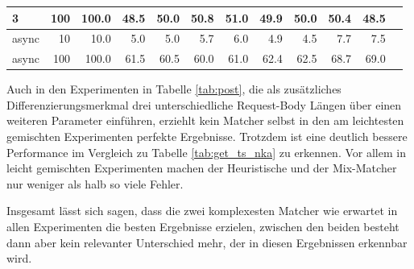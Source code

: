 \documentclass[12pt,a4paper]{report}
\begin{document}
\begin{table}[H]
\begin{tabular}{|l|r|r|r|r|r|r|r|r|r|r|r|}
		3                        & 100                                & 100.0                           & 48.5                        & 50.0                      & 50.8                           & 51.0 & 49.9 & 50.0 & 50.4 & 48.5 \\ \hline
		async                    & 10                                 & 10.0                            & 5.0                         & 5.0                       & 5.7                            & 6.0  & 4.9  & 4.5  & 7.7  & 7.5  \\ \hline
		async                    & 100                                & 100.0                           & 61.5                        & 60.5                      & 60.0                           & 61.0 & 62.4 & 62.5 & 68.7 & 69.0 \\ \hline
	\end{tabular}
\end{table}

Auch in den Experimenten in Tabelle \ref{tab:post}, die als zusätzliches Differenzierungsmerkmal drei unterschiedliche
Request-Body Längen über einen weiteren Parameter einführen, erziehlt kein Matcher selbst in den am leichtesten gemischten
Experimenten perfekte Ergebnisse. Trotzdem ist eine deutlich bessere Performance im Vergleich zu Tabelle \ref{tab:get_ts_nka} zu
erkennen. Vor allem in leicht gemischten Experimenten machen der Heuristische und der Mix-Matcher nur weniger als halb so viele
Fehler.

Insgesamt lässt sich sagen, dass die zwei komplexesten Matcher wie erwartet in allen Experimenten die besten Ergebnisse erzielen,
zwischen den beiden besteht dann aber kein relevanter Unterschied mehr, der in diesen Ergebnissen erkennbar wird.
\end{document}

